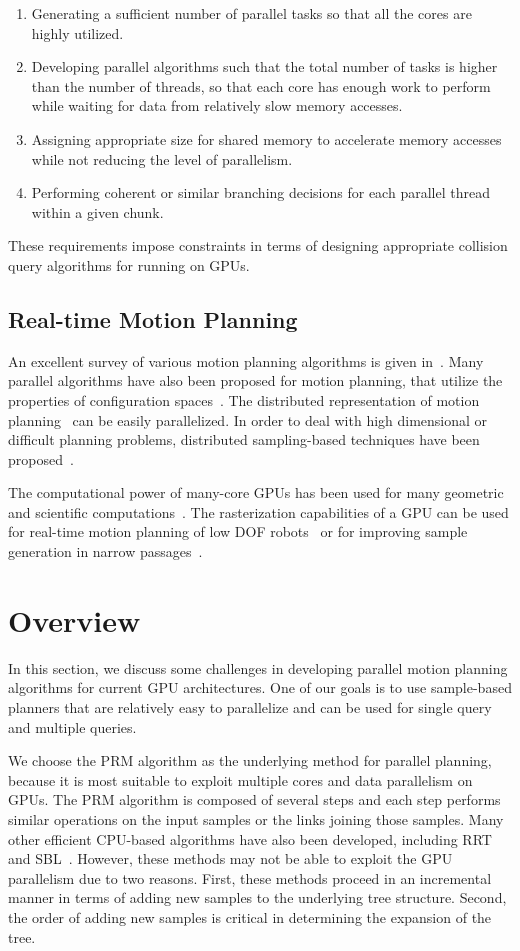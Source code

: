 \begin{enumerate}
\item Generating a sufficient number of parallel tasks so that all the cores are highly utilized.
\item Developing parallel algorithms such that the total number of tasks is higher than the number of threads, so that each core has enough work to perform
while waiting for data from relatively slow memory accesses.
\item Assigning appropriate size for shared memory to accelerate memory accesses while not reducing the level of parallelism.
\item Performing coherent or similar branching decisions for each parallel thread within a given chunk.
\end{enumerate}
These requirements impose constraints in terms of designing appropriate collision query algorithms for running on GPUs.

\subsection{Real-time Motion Planning}
An excellent survey of various motion planning algorithms is given in~\cite{LaValle:2006}. Many parallel algorithms
have also been proposed for motion planning, that utilize the properties of configuration spaces~\cite{Perez91}.
The distributed representation of motion planning~\cite{BL91:rmp} can be easily parallelized. In order to deal with high dimensional
or difficult planning problems, distributed sampling-based techniques have been proposed~\cite{plaku+2007:OOPSM}.

The computational power of many-core GPUs has been used for many geometric
and scientific computations~\cite{GPGPU07}. The rasterization capabilities of
a GPU can be used for real-time motion planning of low DOF robots~\cite{Hoff00,Sud07} or for improving sample generation in narrow passages~\cite{PKLM00,FGLM01}.

\section{Overview}
\label{sec:4:overview}
In this section, we discuss some challenges in developing parallel motion planning algorithms for current GPU architectures. One of our goals is to use sample-based planners that are relatively easy to parallelize and can be used for single query and multiple queries.

We choose the PRM algorithm as the underlying method for parallel planning, because it is most suitable to exploit multiple cores and data parallelism on GPUs. The PRM algorithm is composed of several steps and each step performs similar operations on the input samples or the links joining those samples. Many other efficient CPU-based algorithms have also been developed, including RRT~\cite{Kuffner00} and SBL~\cite{SL01}. However, these methods may not be able to exploit the GPU parallelism due to two reasons. First, these methods proceed in an incremental manner in terms of adding new samples to the underlying tree structure. Second, the order of adding new samples is critical in determining the expansion of the tree.

